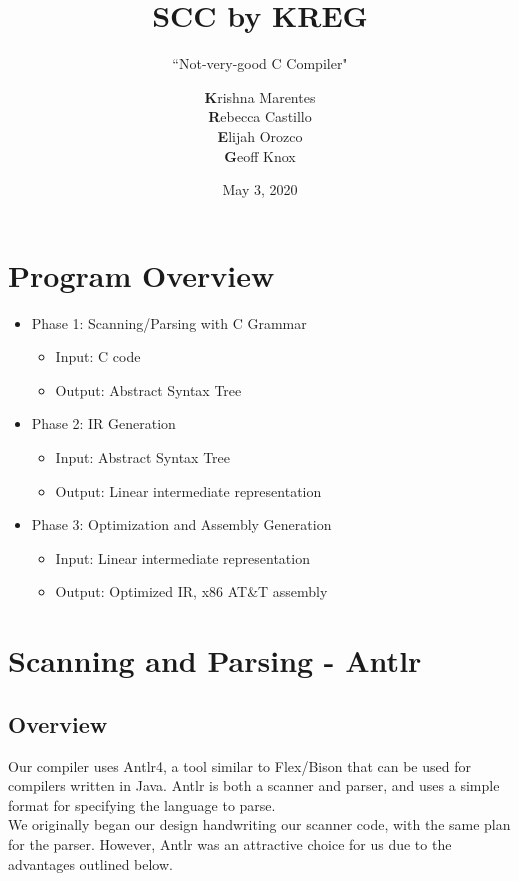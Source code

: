 \documentclass{scrartcl}
\title{SCC by KREG}
\subtitle{``Not-very-good C Compiler"}
\author{\textbf{K}rishna Marentes\\\textbf{R}ebecca Castillo\\\textbf{E}lijah Orozco\\\textbf{G}eoff Knox}
\date{May 3, 2020}
\begin{document}
\maketitle
\tableofcontents

\section{Program Overview}
\begin{itemize}
    \item Phase 1: Scanning/Parsing with C Grammar
    \begin{itemize}
        \item Input: C code
        \item Output: Abstract Syntax Tree
    \end{itemize}
    \item Phase 2: IR Generation
    \begin{itemize}
        \item Input: Abstract Syntax Tree
        \item Output: Linear intermediate representation
    \end{itemize}
    \item Phase 3: Optimization and Assembly Generation
    \begin{itemize}
        \item Input: Linear intermediate representation
        \item Output: Optimized IR, x86 AT\&T assembly
    \end{itemize}
\end{itemize}

\section{Scanning and Parsing - Antlr}
\subsection{Overview}
Our compiler uses Antlr4, a tool similar to Flex/Bison that can be used for compilers written in Java. Antlr is both a scanner and parser, and uses a simple format for specifying the language to parse.\\
We originally began our design handwriting our scanner code, with the same plan for the parser. However, Antlr was an attractive choice for us due to the advantages outlined below.
\end{document}
